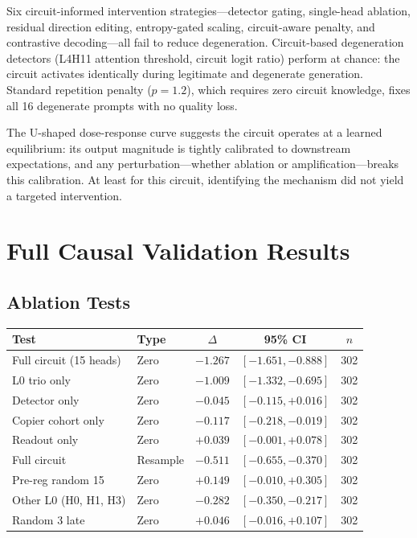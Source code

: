 \documentclass{article}
\begin{document}
\begin{appendices}
Six circuit-informed intervention strategies---detector gating,
single-head ablation, residual direction editing, entropy-gated scaling,
circuit-aware penalty, and contrastive decoding---all fail to reduce
degeneration. Circuit-based degeneration detectors (L4H11 attention
threshold, circuit logit ratio) perform at chance: the circuit activates
identically during legitimate and degenerate generation. Standard
repetition penalty ($p = 1.2$), which requires zero circuit knowledge,
fixes all 16 degenerate prompts with no quality loss.

The U-shaped dose-response curve suggests the circuit operates at a
learned equilibrium: its output magnitude is tightly calibrated to
downstream expectations, and any perturbation---whether ablation or
amplification---breaks this calibration. At least for this circuit,
identifying the mechanism did not yield a targeted intervention.


\section{Full Causal Validation Results}
\label{app:causal}

\subsection{Ablation Tests}

\begin{table}[h]
\centering
\begin{tabular}{llccc}
\toprule
\textbf{Test} & \textbf{Type} & \textbf{$\Delta$} & \textbf{95\% CI} & \textbf{$n$} \\
\midrule
Full circuit (15 heads) & Zero & $-1.267$ & $[-1.651, -0.888]$ & 302 \\
L0 trio only & Zero & $-1.009$ & $[-1.332, -0.695]$ & 302 \\
Detector only & Zero & $-0.045$ & $[-0.115, +0.016]$ & 302 \\
Copier cohort only & Zero & $-0.117$ & $[-0.218, -0.019]$ & 302 \\
Readout only & Zero & $+0.039$ & $[-0.001, +0.078]$ & 302 \\
Full circuit & Resample & $-0.511$ & $[-0.655, -0.370]$ & 302 \\
Pre-reg random 15 & Zero & $+0.149$ & $[-0.010, +0.305]$ & 302 \\
Other L0 (H0, H1, H3) & Zero & $-0.282$ & $[-0.350, -0.217]$ & 302 \\
Random 3 late & Zero & $+0.046$ & $[-0.016, +0.107]$ & 302 \\
\bottomrule
\end{tabular}
\end{table}


\end{appendices}
\end{document}
